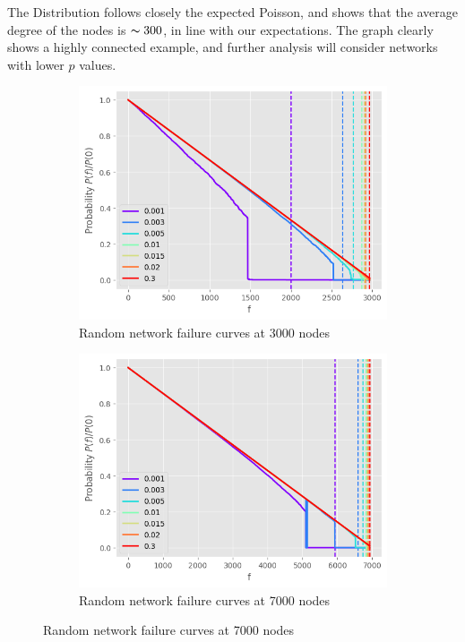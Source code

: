 \documentclass[
]{article}
\begin{document}
The Distribution follows closely the expected Poisson, and shows that
the average degree of the nodes is \(\thicksim 300\), in line with our
expectations. The graph clearly shows a highly connected example, and
further analysis will consider networks with lower \(p\) values.

\begin{figure}
  \centering
  \begin{subfigure}{0.4\textwidth}
    \includegraphics{assets/random_3000.png}
    \caption{Random network failure curves at 3000 nodes}
  \end{subfigure}
  \hfill
  \centering
  \begin{subfigure}{0.4\textwidth}
    \includegraphics{assets/random_7000.png}
    \caption{Random network failure curves at 7000 nodes}
  \end{subfigure}
\end{figure}
\end{document}
